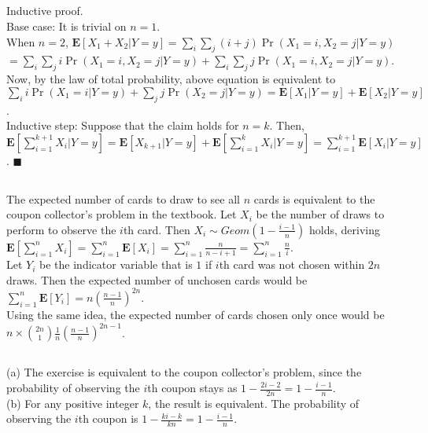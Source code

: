 \documentclass{article}
\begin{document}
\subsection{}
Inductive proof.\\
Base case: It is trivial on $n=1$.\\
When $n=2$, $\textbf{E}[X_1+X_2|Y=y]=\sum\limits_i\sum\limits_j(i+j)\Pr(X_1=i,X_2=j|Y=y)$\\
$=\sum\limits_i\sum\limits_ji\Pr(X_1=i,X_2=j|Y=y)+\sum\limits_i\sum\limits_jj\Pr(X_1=i,X_2=j|Y=y)$.\\
Now, by the law of total probability, above equation is equivalent to\\
$\sum\limits_i i\Pr(X_1=i|Y=y)+\sum\limits_j j\Pr(X_2=j|Y=y)=\textbf{E}[X_1|Y=y]+\textbf{E}[X_2|Y=y]$.\\
Inductive step: Suppose that the claim holds for $n=k$. Then,\\
$\textbf{E}[\sum\limits_{i=1}^{k+1}X_i|Y=y]=\textbf{E}[X_{k+1}|Y=y]+\textbf{E}[\sum\limits_{i=1}^kX_i|Y=y]=\sum\limits_{i=1}^{k+1}\textbf{E}[X_i|Y=y]$. $\blacksquare$
\subsection{}
The expected number of cards to draw to see all $n$ cards is equivalent to the coupon collector's problem in the textbook.
Let $X_i$ be the number of draws to perform to observe the $i$th card.
Then $X_i\sim Geom(1-\frac{i-1}{n})$ holds, deriving $\textbf{E}[\sum\limits_{i=1}^nX_i]=\sum\limits_{i=1}^n\textbf{E}[X_i]=\sum\limits_{i=1}^n\frac{n}{n-i+1}=\sum\limits_{i=1}^n\frac{n}{i}$.\\
Let $Y_i$ be the indicator variable that is $1$ if $i$th card was not chosen within $2n$ draws.
Then the expected number of unchosen cards would be $\sum\limits_{i=1}^n\textbf{E}[Y_i]=n(\frac{n-1}{n})^{2n}$.\\
Using the same idea, the expected number of cards chosen only once would be $n\times\binom{2n}{1}\frac{1}{n}(\frac{n-1}{n})^{2n-1}$.
\subsection{}
(a) The exercise is equivalent to the coupon collector's problem, since the probability of observing the $i$th coupon stays as $1-\frac{2i-2}{2n}=1-\frac{i-1}{n}$.\\
(b) For any positive integer $k$, the result is equivalent. The probability of observing the $i$th coupon is $1-\frac{ki-k}{kn}=1-\frac{i-1}{n}$.
\end{document}
